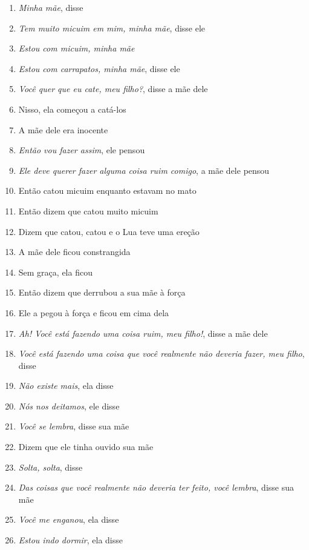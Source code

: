 \begin{enumerate}
\item \textit{Minha mãe}, disse
\item \textit{Tem muito micuim em mim, minha mãe}, disse ele
\item \textit{Estou com micuim, minha mãe}
\item \textit{Estou com carrapatos, minha mãe}, disse ele
\item \textit{Você quer que eu cate, meu filho?}, disse a mãe dele
\item Nisso, ela começou a catá-los

\begin{center}\end{center}

\item A mãe dele era inocente
\item \textit{Então vou fazer assim}, ele pensou
\item \textit{Ele deve querer fazer alguma coisa ruim comigo}, a mãe dele pensou
\item Então catou micuim enquanto estavam no mato
\item Então dizem que catou muito micuim
\item Dizem que catou, catou e o Lua teve uma ereção
\item A mãe dele ficou constrangida
\item Sem graça, ela ficou

\begin{center}\end{center}

\item Então dizem que derrubou a sua mãe à força
\item Ele a pegou à força e ficou em cima dela
\item \textit{Ah! Você está fazendo uma coisa ruim, meu filho!}, disse a mãe dele
\item \textit{Você está fazendo uma coisa que você realmente não deveria fazer, meu filho}, disse
\item \textit{Não existe mais}, ela disse
\item \textit{Nós nos deitamos}, ele disse
\item \textit{Você se lembra}, disse sua mãe
\item Dizem que ele tinha ouvido sua mãe
\item \textit{Solta, solta}, disse
\item \textit{Das coisas que você realmente não deveria ter feito, você lembra}, disse sua mãe
\item \textit{Você me enganou}, ela disse
\item \textit{Estou indo dormir}, ela disse


\end{enumerate}
